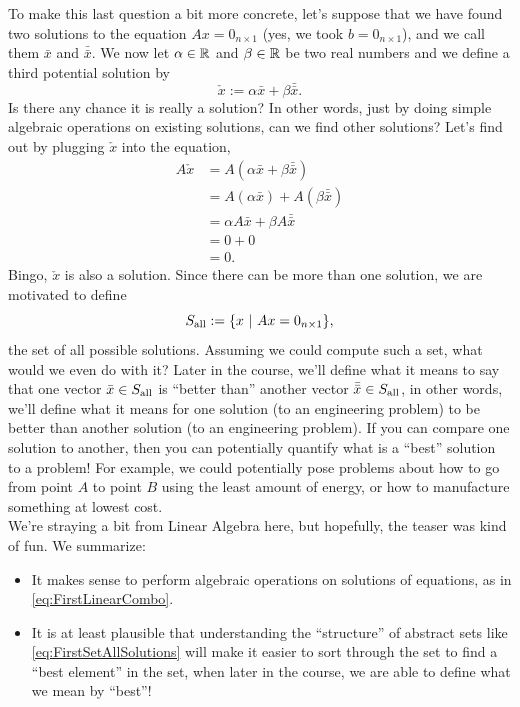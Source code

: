 To make this last question a bit more concrete, let's suppose that we have found two solutions to the equation $Ax=0_{n \times 1}$ (yes, we took $b=0_{n \times 1}$), and we call them $\bar{x}$ and  $\bar{\bar{x}}$. We now let $\alpha \in \mathbb R$ and $\beta \in \mathbb R$ be two real numbers and we define a third potential solution by 
\begin{equation}
\label{eq:FirstLinearCombo}
   \check x := \alpha \bar{x} + \beta \bar{\bar{x}}.  
\end{equation}
Is there any chance it is really a solution? In other words, just by doing simple algebraic operations on existing solutions, can we find other solutions? Let's find out by plugging $\check x$ into the equation,
\begin{align*}
    A \check x & = A \left( \alpha \bar{x} + \beta \bar{\bar{x}} \right) \\
    & = A \left(\alpha \bar{x}\right) + A \left(\beta \bar{\bar{x}} \right)\\
    & =  \alpha A \bar{x} + \beta A \bar{\bar{x}} \\
    &= 0 + 0\\
    &=0.
\end{align*}
Bingo, $\check x$ is also a solution. Since there can be more than one solution, we are motivated to define
\begin{equation}
\label{eq:FirstSetAllSolutions}
    S_{\rm all}:=\{ x~|~ A x =0_{n \times 1} \}, 
\end{equation}
the set of all possible solutions. Assuming we could compute such a set, what would we even do with it? Later in the course, we'll define what it means to say that one vector $\bar{x} \in S_{\rm all}$ is ``better than'' another vector $\bar{\bar x} \in S_{\rm all}$, in other words, we'll define what it means for one solution (to an engineering problem) to be better than another solution (to an engineering problem). If you can compare one solution to another, then you can potentially quantify what is a ``best'' solution to a problem! For example, we could potentially pose problems about how to go from point $A$ to point $B$ using the least amount of energy, or how to manufacture something at lowest cost.\\

We're straying a bit from Linear Algebra here, but hopefully, the teaser was kind of fun. We summarize:
\begin{itemize}
    \item It makes sense to perform algebraic operations on solutions of equations, as in \eqref{eq:FirstLinearCombo}.
    \item It is at least plausible that understanding the ``structure'' of abstract sets like \eqref{eq:FirstSetAllSolutions} will make it easier to sort through the set to find a ``best element'' in the set, when later in the course, we are able to define what we mean by ``best''!
\end{itemize}

